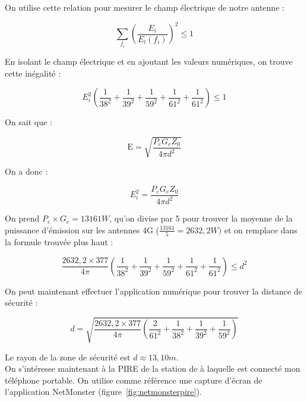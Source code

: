 \documentclass[12]{article}
\begin{document}
On utilise cette relation pour mesurer le champ électrique de notre antenne :

\begin{equation*}
    \sum_{f_{i}} \left(\frac{E_{i}}{E_{l}(f_{i})}\right)^2 \leq 1
\end{equation*}

En isolant le champ électrique et en ajoutant les valeurs numériques, on trouve cette inégalité :

\begin{equation*}
    E_{i}^2\left(\frac{1}{38^2} + \frac{1}{39^2} + \frac{1}{59^2} + \frac{1}{61^2} + \frac{1}{61^2} \right) \leq 1
\end{equation*}

On sait que :

\begin{equation*}
    \text{E} = \sqrt{\frac{P_{e} G_{e} Z_{0}}{4 \pi d^2}}
\end{equation*}

On a donc : 

\begin{equation*}
    E_{i}^2 = \frac{P_{e} G_{e} Z_{0}}{4 \pi d^2} 
\end{equation*}

On prend $P_{e} \times G_{e} = 13161 W$, qu'on divise par 5 pour trouver la moyenne de la puissance d'émission sur les antennes 4G ($\frac{13161}{5} = 2632,2 W)$ et on remplace dans la formule trouvée plus haut :

\begin{equation*}
   \frac{2632,2 \times 377}{4 \pi} \left(\frac{1}{38^2} + \frac{1}{39^2} + \frac{1}{59^2} + \frac{1}{61^2} + \frac{1}{61^2}\right) \leq d^2
\end{equation*}

On peut maintenant effectuer l'application numérique pour trouver la distance de sécurité :

\begin{equation*}
    d = \sqrt{\frac{2632,2 \times 377}{4 \pi} \left(\frac{2}{61^2} + \frac{1}{38^2} + \frac{1}{39^2} + \frac{1}{59^2} \right)}
\end{equation*}

Le rayon de la zone de sécurité est $d \approx 13,10m$. \\


On s'intéresse maintenant à la PIRE de la station de à laquelle est connecté mon téléphone portable. On utilise comme référence une capture d'écran de l'application NetMonster (figure~\ref{fig:netmonsterpire}).
\end{document}
